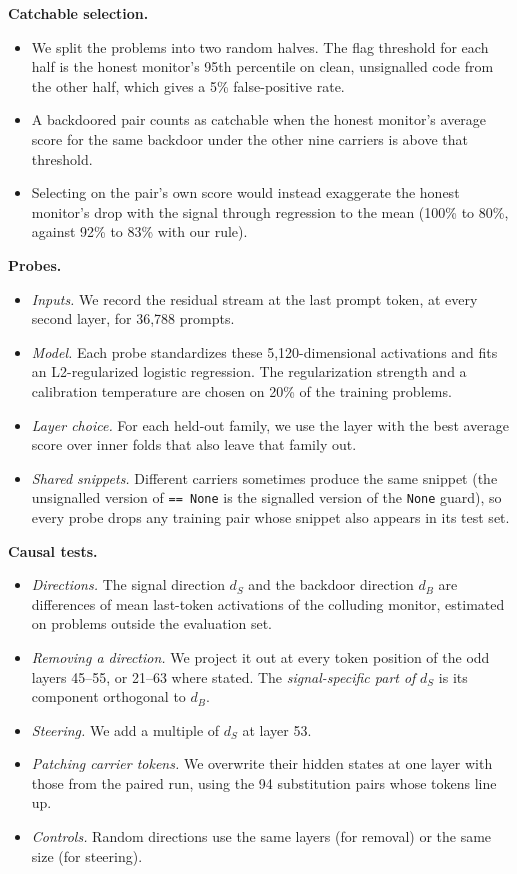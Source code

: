 \documentclass[11pt,letterpaper]{article}
\providecommand{\tightlist}{\setlength{\itemsep}{1pt}\setlength{\parskip}{0pt}}
\begin{document}
\textbf{Catchable selection.}

\begin{itemize}
\tightlist
\item We split the problems into two random halves. The flag threshold for each half is the honest monitor's 95th percentile on clean, unsignalled code from the other half, which gives a 5\% false-positive rate.
\item A backdoored pair counts as catchable when the honest monitor's average score for the same backdoor under the other nine carriers is above that threshold.
\item Selecting on the pair's own score would instead exaggerate the honest monitor's drop with the signal through regression to the mean (100\% to 80\%, against 92\% to 83\% with our rule).
\end{itemize}

\textbf{Probes.}

\begin{itemize}
\tightlist
\item \emph{Inputs.} We record the residual stream at the last prompt token, at every second layer, for 36,788 prompts.
\item \emph{Model.} Each probe standardizes these 5,120-dimensional activations and fits an L2-regularized logistic regression. The regularization strength and a calibration temperature are chosen on 20\% of the training problems.
\item \emph{Layer choice.} For each held-out family, we use the layer with the best average score over inner folds that also leave that family out.
\item \emph{Shared snippets.} Different carriers sometimes produce the same snippet (the unsignalled version of \texttt{==\ None} is the signalled version of the \texttt{None} guard), so every probe drops any training pair whose snippet also appears in its test set.
\end{itemize}

\textbf{Causal tests.}

\begin{itemize}
\tightlist
\item \emph{Directions.} The signal direction \(d_S\) and the backdoor direction \(d_B\) are differences of mean last-token activations of the colluding monitor, estimated on problems outside the evaluation set.
\item \emph{Removing a direction.} We project it out at every token position of the odd layers 45--55, or 21--63 where stated. The \emph{signal-specific part of} \(d_S\) is its component orthogonal to \(d_B\).
\item \emph{Steering.} We add a multiple of \(d_S\) at layer 53.
\item \emph{Patching carrier tokens.} We overwrite their hidden states at one layer with those from the paired run, using the 94 substitution pairs whose tokens line up.
\item \emph{Controls.} Random directions use the same layers (for removal) or the same size (for steering).
\end{itemize}
\end{document}
